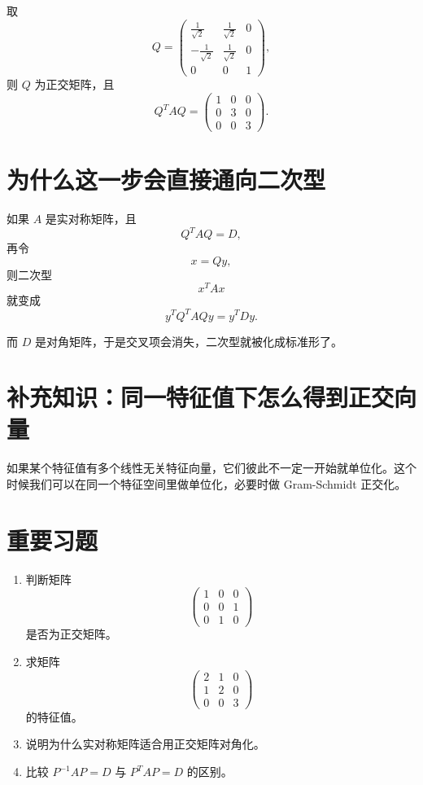 \documentclass[11pt,oneside,UTF8]{ctexbook}
\begin{document}
\begin{examplebox}[例 9：完整做一次正交对角化]
取
\[
Q=
\begin{pmatrix}
\frac{1}{\sqrt2}&\frac{1}{\sqrt2}&0\\[0.4em]
-\frac{1}{\sqrt2}&\frac{1}{\sqrt2}&0\\[0.4em]
0&0&1
\end{pmatrix},
\]
则 \(Q\) 为正交矩阵，且
\[
Q^TAQ=
\begin{pmatrix}
1&0&0\\
0&3&0\\
0&0&3
\end{pmatrix}.
\]
\end{examplebox}

\section{为什么这一步会直接通向二次型}

如果 \(A\) 是实对称矩阵，且
\[
Q^TAQ=D,
\]
再令
\[
x=Qy,
\]
则二次型
\[
x^TAx
\]
就变成
\[
y^TQ^TAQy=y^TDy.
\]

而 \(D\) 是对角矩阵，于是交叉项会消失，二次型就被化成标准形了。

\section{补充知识：同一特征值下怎么得到正交向量}

如果某个特征值有多个线性无关特征向量，它们彼此不一定一开始就单位化。这个时候我们可以在同一个特征空间里做单位化，必要时做 Gram-Schmidt 正交化。

\section{重要习题}

\begin{exercisebox}[第 4 章重要习题]
\begin{enumerate}
  \item 判断矩阵
  \[
  \begin{pmatrix}
  1&0&0\\
  0&0&1\\
  0&1&0
  \end{pmatrix}
  \]
  是否为正交矩阵。
  \item 求矩阵
  \[
  \begin{pmatrix}
  2&1&0\\
  1&2&0\\
  0&0&3
  \end{pmatrix}
  \]
  的特征值。
  \item 说明为什么实对称矩阵适合用正交矩阵对角化。
  \item 比较 \(P^{-1}AP=D\) 与 \(P^TAP=D\) 的区别。
\end{enumerate}
\end{exercisebox}
\end{document}
